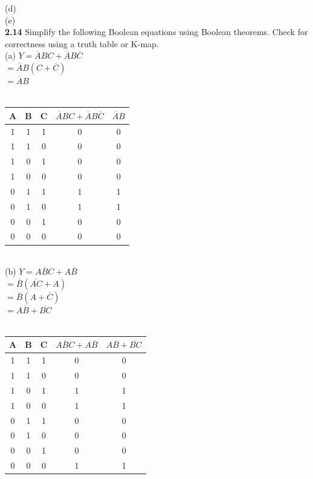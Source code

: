 \documentclass[12pt,a4paper]{report}
\newcommand*{\al}{\overline{A}}
\newcommand*{\bl}{\overline{B}}
\newcommand*{\cl}{\overline{C}}
\begin{document}
\begin{normalsize}
(d) \\
(e) \\

\textbf{2.14} Simplify the following Boolean equations using Boolean theorems. Check for correctness using a truth table or K-map. \\

(a) $ Y = \overline{A}BC + \overline{A}B\overline{C} $ \\
$ = \al{}B(C + \cl{}) $ \\
$ = \al{}B $ \\ \\
\begin{tabular}{|c|c|c|c|c|}
A & B & C & $ \al{}BC+\al{}B\cl{} $ & $ \al{}B $ \\ 
\hline 
1 & 1 & 1 & 0 & 0 \\ 
\hline 
1 & 1 & 0 & 0 & 0 \\ 
\hline 
1 & 0 & 1 & 0 & 0 \\ 
\hline 
1 & 0 & 0 & 0 & 0 \\ 
\hline 
0 & 1 & 1 & 1 & 1 \\ 
\hline 
0 & 1 & 0 & 1 & 1 \\ 
\hline 
0 & 0 & 1 & 0 & 0 \\ 
\hline 
0 & 0 & 0 & 0 & 0 \\ 
\hline 
\end{tabular} \\

(b) $ Y = \overline{ABC} + A\overline{B} $ \\
$ = \bl{}(\overline{AC} + A) $ \\
$ = \bl{}(A + \cl{}) $ \\
$ = A\bl{} + \overline{BC} $ \\ \\
\begin{tabular}{|c|c|c|c|c|}
A & B & C & $ \overline{ABC} + A\overline{B} $ & $ A\bl{} + \overline{BC} $ \\ 
\hline 
1 & 1 & 1 & 0 & 0 \\ 
\hline 
1 & 1 & 0 & 0 & 0 \\ 
\hline 
1 & 0 & 1 & 1 & 1 \\ 
\hline 
1 & 0 & 0 & 1 & 1 \\ 
\hline 
0 & 1 & 1 & 0 & 0 \\ 
\hline 
0 & 1 & 0 & 0 & 0 \\ 
\hline 
0 & 0 & 1 & 0 & 0 \\ 
\hline 
0 & 0 & 0 & 1 & 1 \\ 
\hline 
\end{tabular} \\



\end{normalsize}
\end{document}
